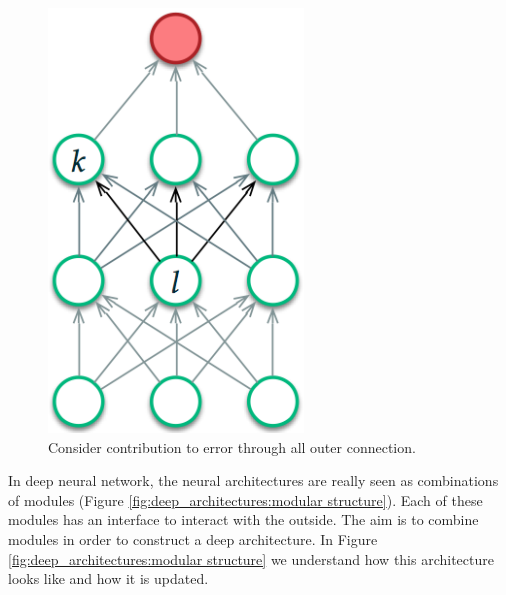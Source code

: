 \begin{figure}[H]
	\centering
	\includegraphics[scale=0.7]{
        images/16_DeepLearning_learningHiddenLayer.png
    }
	\caption{Consider contribution to error through all outer connection.}
	\label{fig.training_mld_hidden_units}
\end{figure}

In deep neural network, the neural architectures are really seen as combinations
of modules (Figure \ref{fig:deep_architectures:modular structure}). Each of these
modules has an interface to interact with the outside. The aim is to combine
modules in order to construct a deep architecture. In Figure \ref{fig:deep_architectures:modular
structure} we understand how this architecture looks like and how it is updated.

